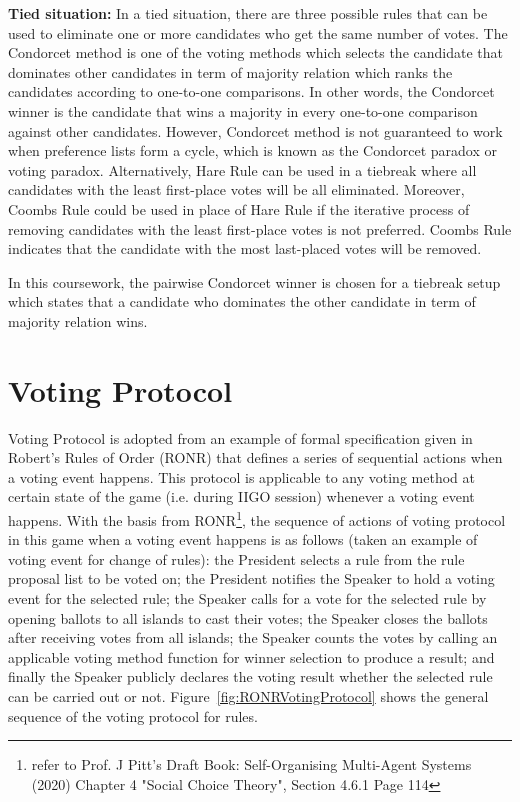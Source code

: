\textbf{Tied situation:} In a tied situation, there are three possible rules that can be used to eliminate one or more candidates who get the same number of votes. The Condorcet method is one of the voting methods which selects the candidate that dominates other candidates in term of majority relation which ranks the candidates according to one-to-one comparisons. In other words, the Condorcet winner is the candidate that wins a majority in every one-to-one comparison against other candidates. However, Condorcet method is not guaranteed to work when preference lists form a cycle, which is known as the Condorcet paradox or voting paradox. Alternatively, Hare Rule can be used in a tiebreak where all candidates with the least first-place votes will be all eliminated. Moreover, Coombs Rule could be used in place of Hare Rule if the iterative process of removing candidates with the least first-place votes is not preferred. Coombs Rule indicates that the candidate with the most last-placed votes will be removed.

In this coursework, the pairwise Condorcet winner is chosen for a tiebreak setup which states that a candidate who dominates the other candidate in term of majority relation wins.



\section{Voting Protocol}
\label{sec:VotingProtocol}
Voting Protocol is adopted from an example of formal specification given in Robert's Rules of Order (RONR) that defines a series of sequential actions when a voting event happens. This protocol is applicable to any voting method at certain state of the game (i.e. during IIGO session) whenever a voting event happens. With the basis from RONR\footnote{refer to Prof. J Pitt's Draft Book: Self-Organising Multi-Agent Systems (2020) Chapter 4 "Social Choice Theory", Section 4.6.1 Page 114}, the sequence of actions of voting protocol in this game when a voting event happens is as follows (taken an example of voting event for change of rules): the President selects a rule from the rule proposal list to be voted on; the President notifies the Speaker to hold a voting event for the selected rule; the Speaker calls for a vote for the selected rule by opening ballots to all islands to cast their votes; the Speaker closes the ballots after receiving votes from all islands; the Speaker counts the votes by calling an applicable voting method function for winner selection to produce a result; and finally the Speaker publicly declares the voting result whether the selected rule can be carried out or not. Figure~\ref{fig:RONRVotingProtocol} shows the general sequence of the voting protocol for rules.

